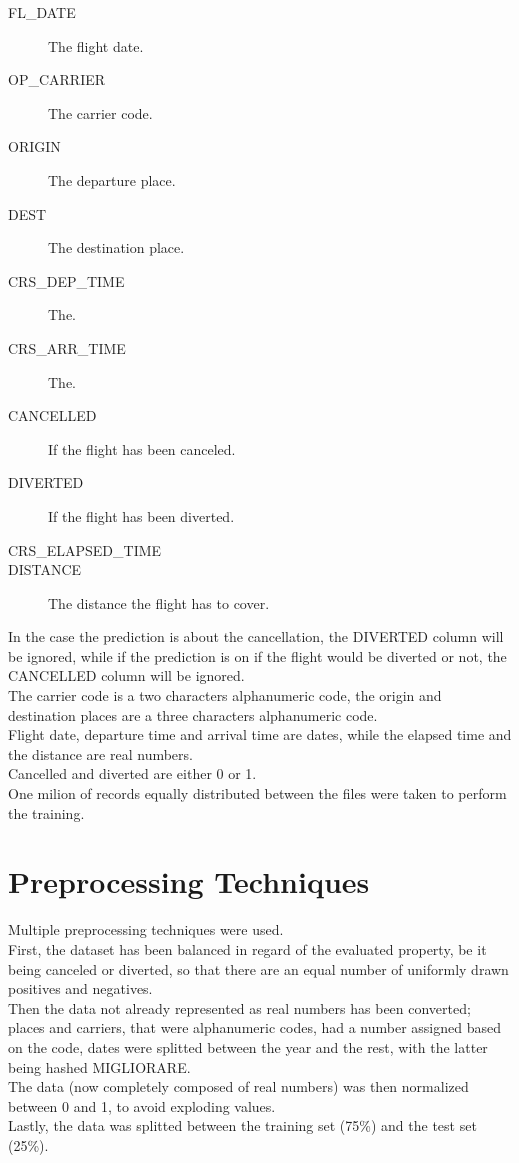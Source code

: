 \documentclass[
	letterpaper, %
	10pt, %
]{class}
\begin{document}
\begin{description}
	\item[FL\_DATE] The flight date.
	\item[OP\_CARRIER] The carrier code.
	\item[ORIGIN] The departure place.
	\item[DEST] The destination place.
	\item[CRS\_DEP\_TIME] The.
	\item[CRS\_ARR\_TIME] The.
	\item[CANCELLED] If the flight has been canceled.
	\item[DIVERTED] If the flight has been diverted.
	\item[CRS\_ELAPSED\_TIME]
	\item[DISTANCE] The distance the flight has to cover.
\end{description}

In the case the prediction is about the cancellation, the DIVERTED column will be ignored, while if the prediction is on if the flight would be diverted or not, the CANCELLED column will be ignored.\\

The carrier code is a two characters alphanumeric code, the origin and destination places are a three characters alphanumeric code.\\
Flight date, departure time and arrival time are dates, while the elapsed time and the distance are real numbers.\\
Cancelled and diverted are either 0 or 1.\\

One milion of records equally distributed between the files were taken to perform the training.


\section{Preprocessing Techniques}

Multiple preprocessing techniques were used.\\
First, the dataset has been balanced in regard of the evaluated property, be it being canceled or diverted, so that there are an equal number of uniformly drawn positives and negatives.\\
Then the data not already represented as real numbers has been converted; places and carriers, that were alphanumeric codes, had a number assigned based on the code, dates were splitted between the year and the rest, with the latter being hashed MIGLIORARE.\\
The data (now completely composed of real numbers) was then normalized between 0 and 1, to avoid exploding values.\\
Lastly, the data was splitted between the training set (75\%) and the test set (25\%).\\
\end{document}
